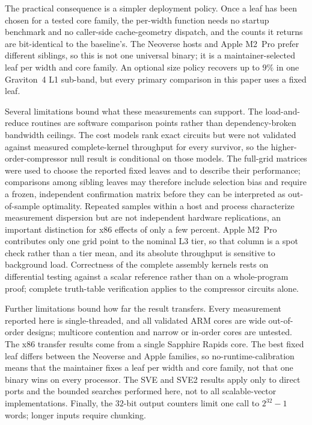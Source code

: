 \documentclass[fleqn,10pt]{wlscirep}
\begin{document}
The practical consequence is a simpler deployment policy. Once a leaf has been chosen for a tested core family, the per-width function needs no startup benchmark and no caller-side cache-geometry dispatch, and the counts it returns are bit-identical to the baseline's. The Neoverse hosts and Apple M2~Pro prefer different siblings, so this is not one universal binary; it is a maintainer-selected leaf per width and core family. An optional size policy recovers up to $9\%$ in one Graviton~4 L1 sub-band, but every primary comparison in this paper uses a fixed leaf.

Several limitations bound what these measurements can support. The load-and-reduce routines are software comparison points rather than dependency-broken bandwidth ceilings. The cost models rank exact circuits but were not validated against measured complete-kernel throughput for every survivor, so the higher-order-compressor null result is conditional on those models. The full-grid matrices were used to choose the reported fixed leaves and to describe their performance; comparisons among sibling leaves may therefore include selection bias and require a frozen, independent confirmation matrix before they can be interpreted as out-of-sample optimality. Repeated samples within a host and process characterize measurement dispersion but are not independent hardware replications, an important distinction for x86 effects of only a few percent. Apple M2~Pro contributes only one grid point to the nominal L3 tier, so that column is a spot check rather than a tier mean, and its absolute throughput is sensitive to background load. Correctness of the complete assembly kernels rests on differential testing against a scalar reference rather than on a whole-program proof; complete truth-table verification applies to the compressor circuits alone.

Further limitations bound how far the result transfers. Every measurement reported here is single-threaded, and all validated ARM cores are wide out-of-order designs; multicore contention and narrow or in-order cores are untested. The x86 transfer results come from a single Sapphire Rapids core. The best fixed leaf differs between the Neoverse and Apple families, so no-runtime-calibration means that the maintainer fixes a leaf per width and core family, not that one binary wins on every processor. The SVE and SVE2 results apply only to direct ports and the bounded searches performed here, not to all scalable-vector implementations. Finally, the $32$-bit output counters limit one call to $2^{32}-1$ words; longer inputs require chunking.
\end{document}
